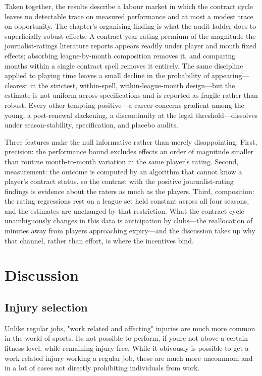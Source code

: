\documentclass{article}
\begin{document}
Taken together, the results describe a labour market in which the contract
cycle leaves no detectable trace on measured performance and at most a modest
trace on opportunity. The chapter's organising finding is what the audit
ladder does to superficially robust effects. A contract-year rating premium
of the magnitude the journalist-ratings literature reports appears readily
under player and month fixed effects; absorbing league-by-month composition
removes it, and comparing months within a single contract spell removes it
entirely. The same discipline applied to playing time leaves a small decline
in the probability of appearing---clearest in the strictest, within-spell,
within-league-month design---but the estimate is not uniform across
specifications and is reported as fragile rather than robust. Every other
tempting positive---a career-concerns gradient among the young, a
post-renewal slackening, a discontinuity at the legal threshold---dissolves
under season-stability, specification, and placebo audits.

Three features make the null informative rather than merely disappointing.
First, precision: the performance bound excludes effects an order of
magnitude smaller than routine month-to-month variation in the same
player's rating. Second, measurement: the outcome is computed by an
algorithm that cannot know a player's contract status, so the contrast with
the positive journalist-rating findings is evidence about the raters as much
as the players. Third, composition: the rating regressions rest on a league
set held constant across all four seasons, and the estimates are unchanged
by that restriction. What the contract cycle unambiguously changes in this
data is anticipation by clubs---the reallocation of minutes away from
players approaching expiry---and the discussion takes up why that channel,
rather than effort, is where the incentives bind.



\section{Discussion}

\subsection{Injury selection}

Unlike regular jobs, "work related and affecting" injuries are much more common in the world of sports. Its not possible to perform, if youre not above a certain fitness level, while remaining injury free. While it obivously is possible to get a work related injury working a regular job, these are much more uncommom and in a lot of cases not directly prohibiting individuals from work. \\
\end{document}
